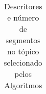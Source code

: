 \begin{table}[!h]
\begin{tabular}{|l|c||l|c||l|c|}
	\end{tabular}
 \caption{Descritores e número de segmentos no tópico selecionado pelos Algoritmos}
 \label{tab:resumodescritoreseqtdsegmetnos}
\end{table}



